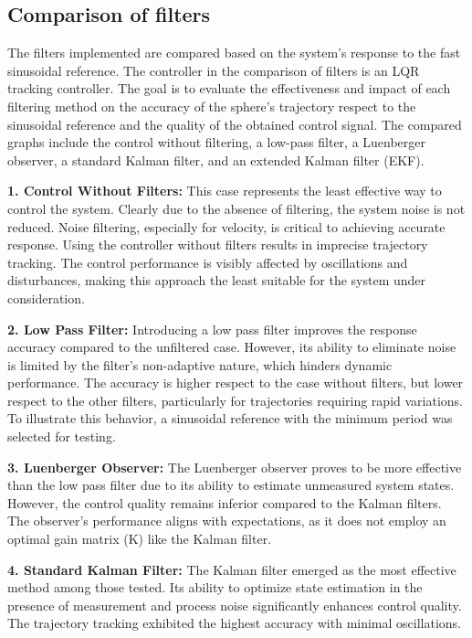 \subsection{Comparison of filters}
\label{subsec:plot_filters}

The filters implemented are compared based on the system's response to the fast sinusoidal reference. The controller in the comparison of filters is an LQR tracking controller. The goal is to evaluate the effectiveness and impact of each filtering method on the accuracy of the sphere's trajectory respect to the sinusoidal reference and the quality of the obtained control signal. The compared graphs include the control without filtering, a low-pass filter, a Luenberger observer, a standard Kalman filter, and an extended Kalman filter (EKF).

\textbf{1. Control Without Filters:}
This case represents the least effective way to control the system. Clearly due to the absence of filtering, the system noise is not reduced. Noise filtering, especially for velocity, is critical to achieving accurate response. Using the controller without filters results in imprecise trajectory tracking. The control performance is visibly affected by oscillations and disturbances, making this approach the least suitable for the system under consideration.

\textbf{2. Low Pass Filter:}
Introducing a low pass filter improves the response accuracy compared to the unfiltered case. However, its ability to eliminate noise is limited by the filter's non-adaptive nature, which hinders dynamic performance. The accuracy is higher respect to the case without filters, but lower respect to the other filters, particularly for trajectories requiring rapid variations. To illustrate this behavior, a sinusoidal reference with the minimum period was selected for testing.

\textbf{3. Luenberger Observer:}
The Luenberger observer proves to be more effective than the low pass filter due to its ability to estimate unmeasured system states. However, the control quality remains inferior compared to the Kalman filters. The observer’s performance aligns with expectations, as it does not employ an optimal gain matrix (K) like the Kalman filter.

\textbf{4. Standard Kalman Filter:}
The Kalman filter emerged as the most effective method among those tested. Its ability to optimize state estimation in the presence of measurement and process noise significantly enhances control quality. The trajectory tracking exhibited the highest accuracy with minimal oscillations.

